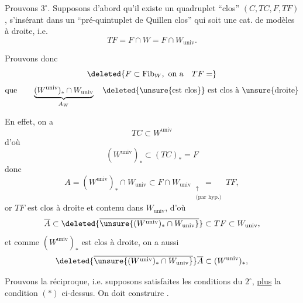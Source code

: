 
Prouvons $3^\circ$. Supposons d'abord qu'il existe
un quadruplet ``clos'' $(C,TC,F,TF)$, s'insérant
dans un ``pré-quintuplet de Quillen clos'' qui
soit une cat. de modèles à droite, i.e.
\[
 TF=F\cap W=F\cap W_{\mathrm{univ}}.
\]

 Prouvons donc
\[
 \deleted{F\subset\mathrm{Fib}_W,\ \text{on a}\quad TF=}
\]
\[
 \text{que}\qquad\underbrace{(W^{\mathrm{univ}})_*\cap W_{\mathrm{univ}}}_{A_W}
 \quad\text{\deleted{\unsure{est clos}} est clos à \unsure{droite}}
\]

En effet, on a
\[
 TC\subset W^{\mathrm{univ}}
\]
d'où
\[
 (W^{\mathrm{univ}})_*\subset(TC)_*=F
\]
donc
\[
 A=(W^{\mathrm{univ}})_*\cap W_{\mathrm{univ}}\subset F\cap W_{\mathrm{univ}}
 \underset{\substack{\uparrow\\\text{(par hyp.)}}}{=}TF,
\]
or $TF$ est clos à droite et contenu dans
$W_{\mathrm{univ}}$, d'où
\[
 \overline A\subset\deleted{\overline{\unsure{(W^{\mathrm{univ}})_*\cap W_{\mathrm{univ}}}}}\subset TF\subset W_{\mathrm{univ}},
\]
et comme $(W^{\mathrm{univ}})_*$ est clos à droite, on a aussi
\[
 \deleted{\overline{\unsure{(W^{\mathrm{univ}})_*\cap W_{\mathrm{univ}}}}}\overline A\subset(W^{\mathrm{univ}})_*,
\]

Prouvons la réciproque, i.e. supposons
satisfaites les conditions du $2^\circ$, \uline{plus} la
condition $(*)$ ci-dessus. On doit construire
 .

